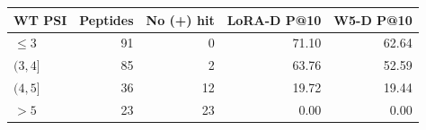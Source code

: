 {\small\setlength{\tabcolsep}{4pt}
\begin{tabularx}{\textwidth}{Xrrrr}
\toprule
WT PSI & Peptides & No (+) hit & LoRA-D P@10 & W5-D P@10 \\
\midrule
$\le3$ & 91 & 0 & 71.10 & 62.64 \\
$(3,4]$ & 85 & 2 & 63.76 & 52.59 \\
$(4,5]$ & 36 & 12 & 19.72 & 19.44 \\
$>5$ & 23 & 23 & 0.00 & 0.00 \\
\bottomrule
\end{tabularx}}
